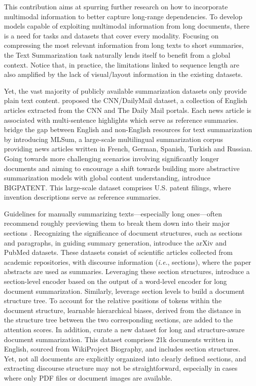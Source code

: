This contribution aims at spurring further research on how to incorporate multimodal information to better capture long-range dependencies. To develop models capable of exploiting multimodal information from long documents, there is a need for tasks and datasets that cover every modality. Focusing on compressing the most relevant information from long texts to short summaries, the Text Summarization task naturally lends itself to benefit from a global context. Notice that, in practice, the limitations linked to sequence length are also amplified by the lack of visual/layout information in the existing datasets. 

Yet, the vast majority of publicly available summarization datasets only provide plain text content. \citet{hermann2015teaching} proposed the CNN/DailyMail dataset, a collection of English articles extracted from the CNN and The Daily Mail portals. Each news article is associated with multi-sentence highlights which serve as reference summaries. \citet{scialom2020mlsum} bridge the gap between English and non-English resources for text summarization by introducing MLSum, a large-scale multilingual summarization corpus providing news articles written in French, German, Spanish, Turkish and Russian. Going towards more challenging scenarios involving significantly longer documents and aiming to encourage a shift towards building more abstractive summarization models with global content understanding, \citet{sharma2019bigpatent} introduce BIGPATENT. This large-scale dataset comprises U.S. patent filings, where invention descriptions serve as reference summaries. 

Guidelines for manually summarizing texts—especially long ones—often recommend roughly previewing them to break them down into their major sections \citep{toprak2009three, luo2019reading}. Recognizing the significance of document structures, such as sections and paragraphs, in guiding summary generation, \citet{cohan2018discourse} introduce the arXiv and PubMed datasets. These datasets consist of scientific articles collected from academic repositories, with discourse information (\textit{i.e.}, sections), where the paper abstracts are used as summaries. Leveraging these section structures, \citet{cohan2018discourse} introduce a section-level encoder based on the output of a word-level encoder for long document summarization. Similarly, \citet{cao2022hibrids} leverage section levels to build a document structure tree. To account for the relative positions of tokens within the document structure, learnable hierarchical biases, derived from the distance in the structure tree between the two corresponding sections, are added to the attention scores. In addition, \citet{cao2022hibrids} curate a new dataset for long and structure-aware document summarization. This dataset comprises 21k documents written in English, sourced from WikiProject Biography, and includes section structures. Yet, not all documents are explicitly organized into clearly defined sections, and extracting discourse structure may not be straightforward, especially in cases where only PDF files or document images are available.

